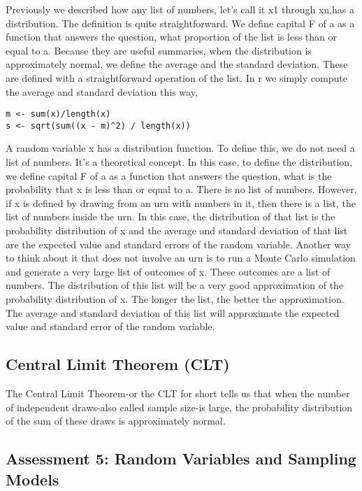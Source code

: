 \documentclass[
]{article}
\begin{document}
Previously we described how any list of numbers, let's call it x1
through xn,has a distribution. The definition is quite straightforward.
We define capital F of a as a function that answers the question, what
proportion of the list is less than or equal to a. Because they are
useful summaries, when the distribution is approximately normal, we
define the average and the standard deviation. These are defined with a
straightforward operation of the list. In r we simply compute the
average and standard deviation this way,

\begin{verbatim}
m <- sum(x)/length(x)
s <- sqrt(sum((x - m)^2) / length(x))
\end{verbatim}

A random variable x has a distribution function. To define this, we do
not need a list of numbers. It's a theoretical concept. In this case, to
define the distribution, we define capital F of a as a function that
answers the question, what is the probability that x is less than or
equal to a. There is no list of numbers. However, if x is defined by
drawing from an urn with numbers in it, then there is a list, the list
of numbers inside the urn. In this case, the distribution of that list
is the probability distribution of x and the average and standard
deviation of that list are the expected value and standard errors of the
random variable. Another way to think about it that does not involve an
urn is to run a Monte Carlo simulation and generate a very large list of
outcomes of x. These outcomes are a list of numbers. The distribution of
this list will be a very good approximation of the probability
distribution of x. The longer the list, the better the approximation.
The average and standard deviation of this list will approximate the
expected value and standard error of the random variable.

\hypertarget{central-limit-theorem-clt}{%
\subsection{Central Limit Theorem
(CLT)}\label{central-limit-theorem-clt}}

The Central Limit Theorem-or the CLT for short tells us that when the
number of independent draws-also called sample size-is large, the
probability distribution of the sum of these draws is approximately
normal.

\hypertarget{assessment-5-random-variables-and-sampling-models}{%
\subsection{Assessment 5: Random Variables and Sampling
Models}\label{assessment-5-random-variables-and-sampling-models}}
\end{document}
